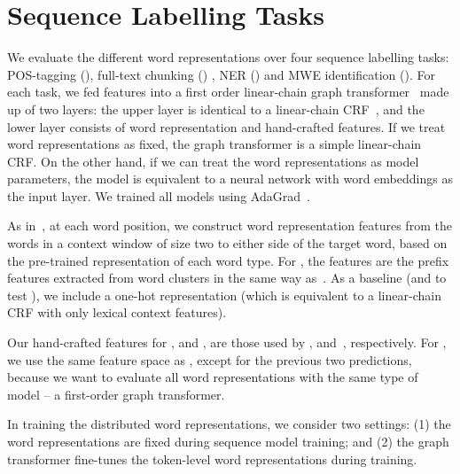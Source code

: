 \section{Sequence Labelling Tasks}
\label{sec:SeqTagging}

We evaluate the different word representations over four sequence
labelling tasks: POS-tagging (\pos), full-text chunking (\chunking) ,
NER (\ner) and MWE identification (\mwe). For
each task, we fed features into a first order linear-chain graph
transformer~\cite{collobert2011natural} made up of two layers: the upper
layer is identical to a linear-chain CRF~\cite{lafferty2001conditional},
and the lower layer consists of word representation and hand-crafted
features. If we treat word representations as fixed, the graph
transformer is a simple linear-chain CRF. On the other hand, if we can
treat the word representations as model parameters, the model is
equivalent to a neural network with word embeddings as the input
layer. We trained all models using AdaGrad~\cite{duchi2011adaptive}.




As in~, at each word position, we construct word
representation features from the words in a context window of size two
to either side of the target word, based on the pre-trained
representation of each word type.  For \brown, the features are the
prefix features extracted from word clusters in the same way
as~. As a baseline (and to test \RQ[1]), we include a one-hot
representation (which is equivalent to a linear-chain CRF with only
lexical context features).

Our hand-crafted features for \pos, \chunking and \mwe, are those used
by , 
and~, respectively. For \ner, we use the same feature
space as , except for the previous two
predictions, because we want to evaluate all word representations with
the same type of model -- a first-order graph transformer.

In training the distributed word representations, we consider two
settings: (1) the word representations are fixed during sequence model
training; and (2) the graph transformer fine-tunes the token-level word
representations during training.


